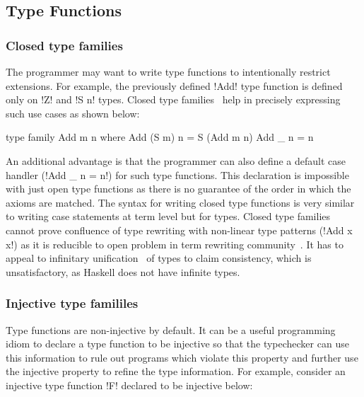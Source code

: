 \documentclass[screen,nonacm,manuscript,review]{acmart} %
\begin{document}
\subsection{Type Functions}\label{sec:rw-type-fun}
\subsubsection{Closed type families}
The programmer may want to write type functions to intentionally restrict extensions. For example, the previously defined !Add! type function is defined only on !Z! and !S n! types. Closed type families~\cite{eisenberg_typefamilies_2014} help in precisely expressing such use cases as shown below:

\begin{CenteredBox}
\begin{code}
type family Add m n where
  Add (S m) n = S (Add m n)
  Add _ n = n
\end{code}
\end{CenteredBox}

An additional advantage is that the programmer can also define a default case handler (!Add _ n = n!) for such type functions. This declaration is impossible with just open type functions as there is no guarantee of the order in which the axioms are matched. The syntax for writing closed type functions is very similar to writing case statements at term level but for types. Closed type families cannot prove confluence of type rewriting with non-linear type patterns (!Add x x!) as it is reducible to open problem in term rewriting community~\cite{mizuhito_rta_1995}. It has to appeal to infinitary unification~\cite{jaffar_efficient_1984} of types to claim consistency, which is unsatisfactory, as Haskell does not have infinite types.

\subsubsection{Injective type famililes}
Type functions are non-injective by default. It can be a useful programming idiom to declare a type function to be injective so that the typechecker can use this information to rule out programs which violate this property and further use the injective property to refine the type information. For example, consider an injective type function !F! declared to be injective below:
\end{document}
